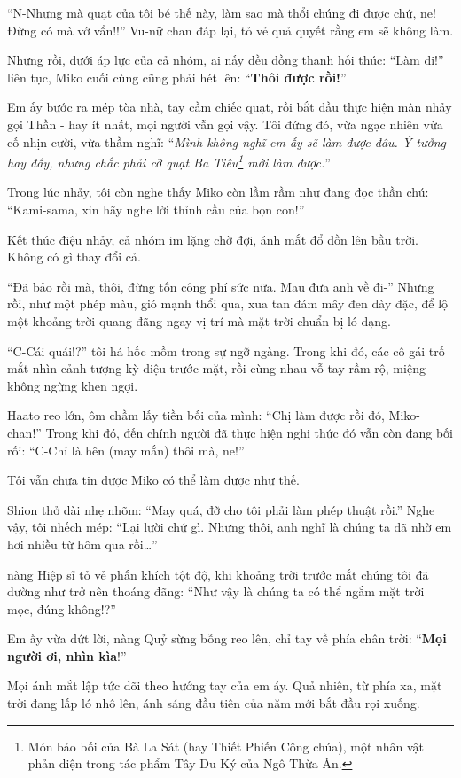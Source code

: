 \documentclass[../main.tex]{subfiles}
\begin{document}
``N-Nhưng mà quạt của tôi bé thế này, làm sao mà thổi chúng đi được chứ, ne! Đừng có mà vớ vẩn!!'' Vu-nữ chan đáp lại, tỏ vẻ quả quyết rằng em sẽ không làm.

Nhưng rồi, dưới áp lực của cả nhóm, ai nấy đều đồng thanh hối thúc: ``Làm đi!'' liên tục, Miko cuối cùng cũng phải hét lên: ``\textbf{Thôi được rồi!}''

Em ấy bước ra mép tòa nhà, tay cầm chiếc quạt, rồi bắt đầu thực hiện màn nhảy gọi Thần - hay ít nhất, mọi người vẫn gọi vậy. Tôi đứng đó, vừa ngạc nhiên vừa cố nhịn cười, vừa thầm nghĩ: ``\textit{Mình không nghĩ em ấy sẽ làm được đâu. Ý tưởng hay đấy, nhưng chắc phải cỡ quạt Ba Tiêu\footnote{Món bảo bối của Bà La Sát (hay Thiết Phiến Công chúa), một nhân vật phản diện trong tác phẩm Tây Du Ký của Ngô Thừa Ân.} mới làm được.}''

Trong lúc nhảy, tôi còn nghe thấy Miko còn lầm rầm như đang đọc thần chú: ``Kami-sama, xin hãy nghe lời thỉnh cầu của bọn con!''

Kết thúc điệu nhảy, cả nhóm im lặng chờ đợi, ánh mắt đổ dồn lên bầu trời. Không có gì thay đổi cả.

``Đã bảo rồi mà, thôi, đừng tốn công phí sức nữa. Mau đưa anh về đi-'' Nhưng rồi, như một phép màu, gió mạnh thổi qua, xua tan đám mây đen dày đặc, để lộ một khoảng trời quang đãng ngay vị trí mà mặt trời chuẩn bị ló dạng.

``C-Cái quái!?'' tôi há hốc mồm trong sự ngỡ ngàng. Trong khi đó, các cô gái trố mắt nhìn cảnh tượng kỳ diệu trước mặt, rồi cùng nhau vỗ tay rầm rộ, miệng không ngừng khen ngợi.

Haato reo lớn, ôm chầm lấy tiền bối của mình: ``Chị làm được rồi đó, Miko-chan!'' Trong khi đó, đến chính người đã thực hiện nghi thức đó vẫn còn đang bối rối: ``C-Chỉ là hên (may mắn) thôi mà, ne!''

Tôi vẫn chưa tin được Miko có thể làm được như thế.

Shion thở dài nhẹ nhõm: ``May quá, đỡ cho tôi phải làm phép thuật rồi.'' Nghe vậy, tôi nhếch mép: ``Lại lười chứ gì. Nhưng thôi, anh nghĩ là chúng ta đã nhờ em hơi nhiều từ hôm qua rồi\dots''

nàng Hiệp sĩ tỏ vẻ phấn khích tột độ, khi khoảng trời trước mắt chúng tôi đã dường như trở nên thoáng đãng: ``Như vậy là chúng ta có thể ngắm mặt trời mọc, đúng không!?''

Em ấy vừa dứt lời, nàng Quỷ sừng bỗng reo lên, chỉ tay về phía chân trời: ``\textbf{Mọi người ơi, nhìn kìa}!''

Mọi ánh mắt lập tức dõi theo hướng tay của em áy. Quả nhiên, từ phía xa, mặt trời đang lấp ló nhô lên, ánh sáng đầu tiên của năm mới bắt đầu rọi xuống.
\end{document}
